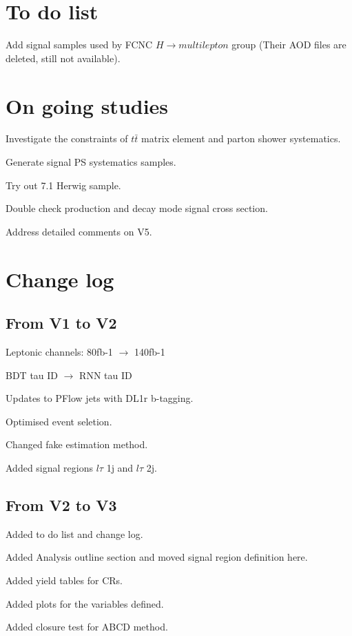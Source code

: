 \section{To do list}

Add signal samples used by FCNC $H\to multilepton$ group (Their AOD files are deleted, still not available).

\section{On going studies}

Investigate the constraints of $t\bar{t}$ matrix element and parton shower systematics.

Generate signal PS systematics samples.

Try out 7.1 Herwig sample.

Double check production and decay mode signal cross section.

Address detailed comments on V5.

\section{Change log}

\subsection{From V1 to V2}

Leptonic channels:  80fb-1 $\to$ 140fb-1

BDT tau ID $\to$ RNN tau ID

Updates to PFlow jets with DL1r b-tagging.

Optimised event seletion.

Changed fake estimation method.

Added signal regions $l\tau$ 1j and $l\tau$ 2j.

\subsection{From V2 to V3}

Added to do list and change log.

Added Analysis outline section and moved signal region definition here.

Added yield tables for CRs.

Added plots for the variables defined.

Added closure test for ABCD method.

